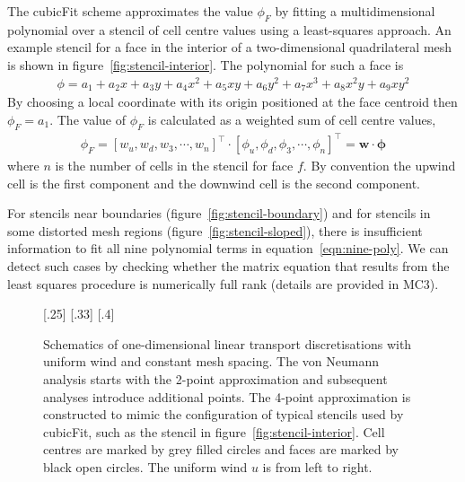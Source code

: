 \documentclass[a4paper,11pt]{article}
\begin{document}
The cubicFit scheme approximates the value $\phi_F$ by fitting a multidimensional polynomial over a stencil of cell centre values using a least-squares approach.  An example stencil for a face in the interior of a two-dimensional quadrilateral mesh is shown in figure~\ref{fig:stencil-interior}.
The polynomial for such a face is
\begin{align}
	\phi = a_1 + a_2 x + a_3 y + a_4 x^2 + a_5 xy + a_6 y^2 + a_7 x^3 + a_8 x^2 y + a_9 x y^2 \label{eqn:nine-poly}
\end{align}
By choosing a local coordinate with its origin positioned at the face centroid then $\phi_F = a_1$.  The value of $\phi_F$ is calculated as a weighted sum of cell centre values,
\begin{align}
	\phi_F = \left[ w_u, w_d, w_3, \cdots, w_n \right]^\intercal \cdot
\left[ \phi_u, \phi_d, \phi_3, \cdots, \phi_n \right]^\intercal
	= \mathbf{w} \cdot \bm{\phi}
\end{align}
where $n$ is the number of cells in the stencil for face $f$.  By convention the upwind cell is the first component and the downwind cell is the second component.

For stencils near boundaries (figure~\ref{fig:stencil-boundary}) and for stencils in some distorted mesh regions (figure~\ref{fig:stencil-sloped}), there is insufficient information to fit all nine polynomial terms in equation~\eqref{eqn:nine-poly}.  We can detect such cases by checking whether the matrix equation that results from the least squares procedure is numerically full rank (details are provided in MC3).

\begin{figure}
	\centering
	[.25\linewidth]{}
	[.33\linewidth]{}
	[.4\linewidth]{}
	\caption{Schematics of one-dimensional linear transport discretisations with uniform wind and constant mesh spacing.  The von Neumann analysis starts with the 2-point approximation and subsequent analyses introduce additional points.  The 4-point approximation is constructed to mimic the configuration of typical stencils used by cubicFit, such as the stencil in figure~\ref{fig:stencil-interior}.  Cell centres are marked by grey filled circles and faces are marked by black open circles.  The uniform wind $u$ is from left to right.}
	\label{fig:vonNeumann}
\end{figure}
\end{document}
